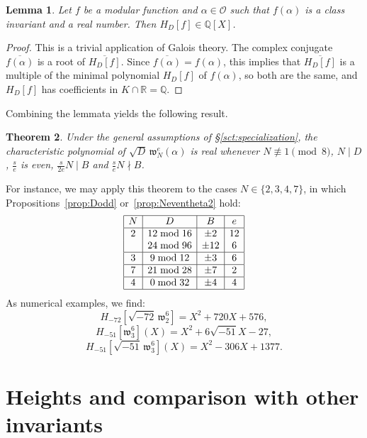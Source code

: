 \documentclass[12pt,twoside,leqno]{article}
\newtheorem{theorem}{Theorem}[section]
\newtheorem{lemma}[theorem]{Lemma}
\numberwithin{equation}{section}
\newcommand{\w}{\mathfrak w}
\newcommand{\OO}{\mathcal O}
\newcommand{\R}{\mathbb R}
\newcommand{\Q}{\mathbb Q}
\begin{document}
\begin {lemma}
Let $f$ be a modular function and $\alpha \in \OO$ such that $f (\alpha)$ is
a class invariant and a real number. Then
$H_D [f] \in \Q [X]$.
\end {lemma}

\begin{proof}
This is a trivial application of Galois theory.
The complex conjugate $\overline {f (\alpha)}$ is a root of
$\overline {H_D[f]}$. Since $\overline {f (\alpha)} = f (\alpha)$,
this implies that $\overline {H_D[f]}$ is a multiple of the minimal
polynomial $H_D [f]$ of $f (\alpha)$, so both are the same, and
$H_D [f]$ has coefficients in $K \cap \R = \Q$.
\end {proof}

Combining the lemmata yields the following result.

\begin {theorem}
Under the general assumptions of \S\ref {sct:specialization},
the characteristic polynomial of $\sqrt {D} \, \w_N^e (\alpha)$ is real
whenever $N \not\equiv 1 \pmod 8$, $N \mid D$, $\frac {s}{e}$ is even,
$\frac {s}{2e} N \mid B$ and $\frac {s}{e} N \nmid B$.
\end {theorem}

For instance, we may apply this theorem to the cases $N\in \{2, 3,
4, 7\}$, in which Propositions~\ref{prop:Dodd}
or~\ref{prop:Neventheta2} hold:
$$\begin{array}{|c|c|c|c|}\hline
N & D & B & e\\ \hline
2 & 12\bmod 16& \pm 2 & 12 \\ %
  & 24 \bmod 96 & \pm 12 & 6 \\ %
\hline
3 & 9\bmod 12 & \pm 3 & 6 \\
\hline
7 & 21\bmod 28 & \pm 7 & 2 \\
\hline
4 & 0\bmod 32 & \pm 4 & 4 \\ %
\hline
\end{array}$$
As numerical examples, we find:
$$H_{-72}[\sqrt{-72}\, \w_2^6] = X^2 + 720 X + 576,$$
$$H_{-51}[\w_3^6](X) = X^2 + 6 \sqrt{-51} X - 27,$$
$$H_{-51}[\sqrt{-51} \, \w_3^6](X) = X^2 -306 X + 1377.$$

\section{Heights and comparison with other invariants}
\label{sct:heights}
\end{document}
